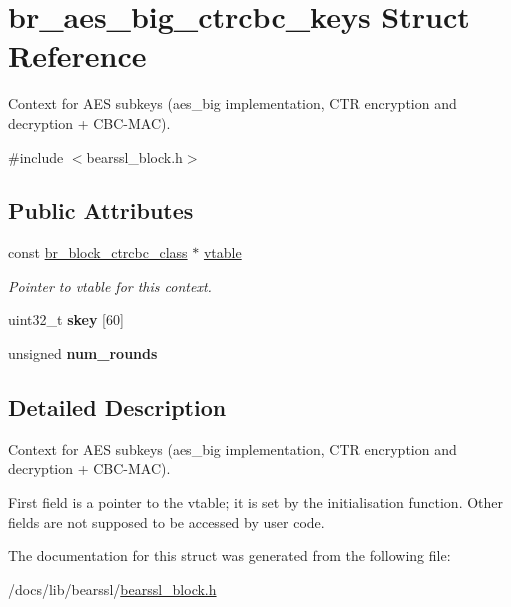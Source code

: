 \hypertarget{structbr__aes__big__ctrcbc__keys}{}\section{br\+\_\+aes\+\_\+big\+\_\+ctrcbc\+\_\+keys Struct Reference}
\label{structbr__aes__big__ctrcbc__keys}


Context for A\+ES subkeys ({\ttfamily aes\+\_\+big} implementation, C\+TR encryption and decryption + C\+B\+C-\/\+M\+AC).  




{\ttfamily \#include $<$bearssl\+\_\+block.\+h$>$}

\subsection*{Public Attributes}
\begin{DoxyCompactItemize}
\item 
\mbox{\label{structbr__aes__big__ctrcbc__keys_a5265f1e458201a84e1eb8a8563ec3ee3}} 
const \hyperlink{bearssl__block_8h_acc35dad952fda67b68df0b107fe26f0b}{br\+\_\+block\+\_\+ctrcbc\+\_\+class} $\ast$ \hyperlink{structbr__aes__big__ctrcbc__keys_a5265f1e458201a84e1eb8a8563ec3ee3}{vtable}
\begin{DoxyCompactList}\small\item\em Pointer to vtable for this context. \end{DoxyCompactList}\item 
\mbox{\label{structbr__aes__big__ctrcbc__keys_ad47a4ce20c8e835c1b8a8b3724ede654}} 
uint32\+\_\+t {\bfseries skey} \mbox{[}60\mbox{]}
\item 
\mbox{\label{structbr__aes__big__ctrcbc__keys_ae44fb2b6af5f783021a217030ba7ffec}} 
unsigned {\bfseries num\+\_\+rounds}
\end{DoxyCompactItemize}


\subsection{Detailed Description}
Context for A\+ES subkeys ({\ttfamily aes\+\_\+big} implementation, C\+TR encryption and decryption + C\+B\+C-\/\+M\+AC). 

First field is a pointer to the vtable; it is set by the initialisation function. Other fields are not supposed to be accessed by user code. 

The documentation for this struct was generated from the following file\+:\begin{DoxyCompactItemize}
\item 
/docs/lib/bearssl/\hyperlink{bearssl__block_8h}{bearssl\+\_\+block.\+h}\end{DoxyCompactItemize}
